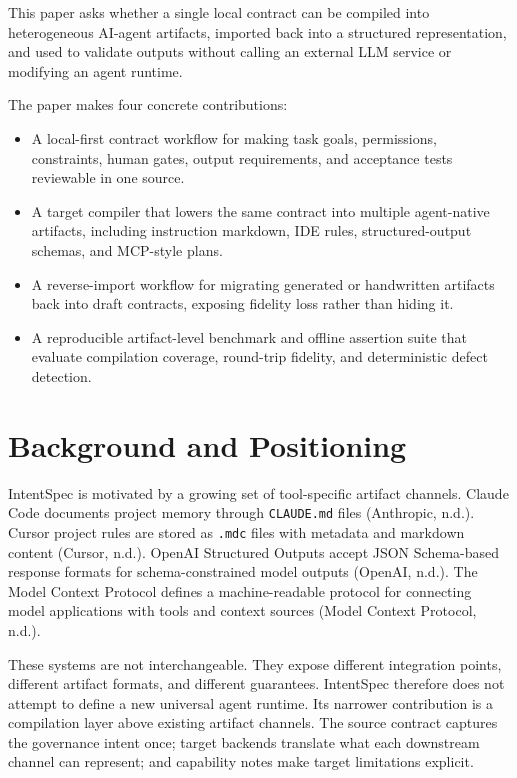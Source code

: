 \documentclass[11pt]{article}
\begin{document}
This paper asks whether a single local contract can be compiled into heterogeneous
AI-agent artifacts, imported back into a structured representation, and used to
validate outputs without calling an external LLM service or modifying an agent
runtime.

The paper makes four concrete contributions:
\begin{itemize}
  \item A local-first contract workflow for making task goals, permissions,
  constraints, human gates, output requirements, and acceptance tests reviewable in
  one source.
  \item A target compiler that lowers the same contract into multiple agent-native
  artifacts, including instruction markdown, IDE rules, structured-output schemas,
  and MCP-style plans.
  \item A reverse-import workflow for migrating generated or handwritten artifacts
  back into draft contracts, exposing fidelity loss rather than hiding it.
  \item A reproducible artifact-level benchmark and offline assertion suite that
  evaluate compilation coverage, round-trip fidelity, and deterministic defect
  detection.
\end{itemize}

\section{Background and Positioning}

IntentSpec is motivated by a growing set of tool-specific artifact channels. Claude
Code documents project memory through \texttt{CLAUDE.md} files (Anthropic, n.d.).
Cursor project rules are stored as \texttt{.mdc} files with metadata and markdown
content (Cursor, n.d.). OpenAI Structured Outputs accept JSON Schema-based response
formats for schema-constrained model outputs (OpenAI, n.d.). The Model Context
Protocol defines a machine-readable protocol for connecting model applications with
tools and context sources (Model Context Protocol, n.d.).

These systems are not interchangeable. They expose different integration points,
different artifact formats, and different guarantees. IntentSpec therefore does not
attempt to define a new universal agent runtime. Its narrower contribution is a
compilation layer above existing artifact channels. The source contract captures the
governance intent once; target backends translate what each downstream channel can
represent; and capability notes make target limitations explicit.
\end{document}
